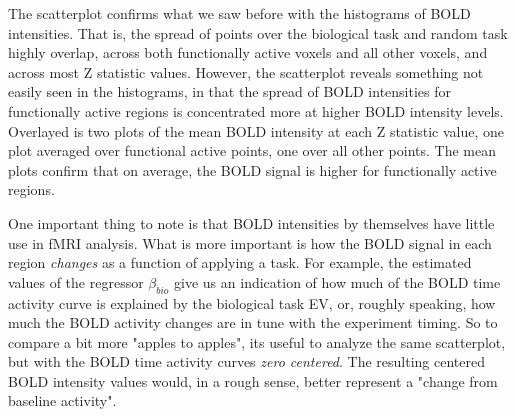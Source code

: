 \documentclass{report}
\begin{document}

The scatterplot confirms what we saw before with the histograms of BOLD intensities. That is, the spread of points over the biological task and random task highly overlap, across both functionally active voxels and all other voxels, and across most Z statistic values. However, the scatterplot reveals something not easily seen in the histograms, in that the spread of BOLD intensities for functionally active regions is concentrated more at higher BOLD intensity levels. Overlayed is two plots of the mean BOLD intensity at each Z statistic value, one plot averaged over functional active points, one over all other points. The mean plots confirm that on average, the BOLD signal is higher for functionally active regions. 

One important thing to note is that BOLD intensities by themselves have little use in fMRI analysis. What is more important is how the BOLD signal in each region \textit{changes} as a function of applying a task. For example, the estimated values of the regressor $\beta_{bio}$ give us an indication of how much of the BOLD time activity curve is explained by the biological task EV, or, roughly speaking, how much the BOLD activity changes are in tune with the experiment timing. So to compare a bit more "apples to apples", its useful to analyze the same scatterplot, but with the BOLD time activity curves \textit{zero centered}. The resulting centered BOLD intensity values would, in a rough sense, better represent a "change from baseline activity". 
\end{document}
